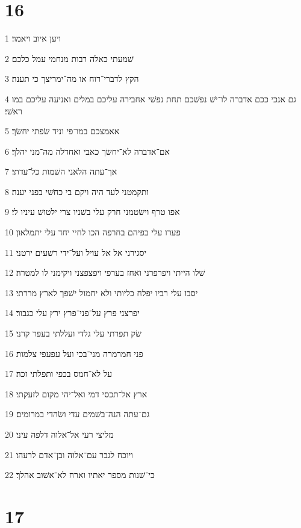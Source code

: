\chapter{16}

\par 1 ויען איוב ויאמר׃
\par 2 שׁמעתי כאלה רבות מנחמי עמל כלכם׃
\par 3 הקץ לדברי־רוח או מה־ימריצך כי תענה׃
\par 4 גם אנכי ככם אדברה לו־ישׁ נפשׁכם תחת נפשׁי אחבירה עליכם במלים ואניעה עליכם במו ראשׁי׃
\par 5 אאמצכם במו־פי וניד שׂפתי יחשׂך׃
\par 6 אם־אדברה לא־יחשׂך כאבי ואחדלה מה־מני יהלך׃
\par 7 אך־עתה הלאני השׁמות כל־עדתי׃
\par 8 ותקמטני לעד היה ויקם בי כחשׁי בפני יענה׃
\par 9 אפו טרף וישׂטמני חרק עלי בשׁניו צרי ילטושׁ עיניו לי׃
\par 10 פערו עלי בפיהם בחרפה הכו לחיי יחד עלי יתמלאון׃
\par 11 יסגירני אל אל עויל ועל־ידי רשׁעים ירטני׃
\par 12 שׁלו הייתי ויפרפרני ואחז בערפי ויפצפצני ויקימני לו למטרה׃
\par 13 יסבו עלי רביו יפלח כליותי ולא יחמול ישׁפך לארץ מררתי׃
\par 14 יפרצני פרץ על־פני־פרץ ירץ עלי כגבור׃
\par 15 שׂק תפרתי עלי גלדי ועללתי בעפר קרני׃
\par 16 פני חמרמרה מני־בכי ועל עפעפי צלמות׃
\par 17 על לא־חמס בכפי ותפלתי זכה׃
\par 18 ארץ אל־תכסי דמי ואל־יהי מקום לזעקתי׃
\par 19 גם־עתה הנה־בשׁמים עדי ושׂהדי במרומים׃
\par 20 מליצי רעי אל־אלוה דלפה עיני׃
\par 21 ויוכח לגבר עם־אלוה ובן־אדם לרעהו׃
\par 22 כי־שׁנות מספר יאתיו וארח לא־אשׁוב אהלך׃

\chapter{17}

